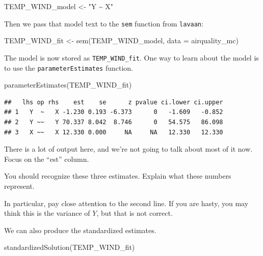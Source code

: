 \documentclass[
]{book}
\newenvironment{Shaded}{\begin{snugshade}}{\end{snugshade}}
\newcommand{\AttributeTok}[1]{\textcolor[rgb]{0.77,0.63,0.00}{#1}}
\newcommand{\FunctionTok}[1]{\textcolor[rgb]{0.00,0.00,0.00}{#1}}
\newcommand{\NormalTok}[1]{#1}
\newcommand{\OtherTok}[1]{\textcolor[rgb]{0.56,0.35,0.01}{#1}}
\newcommand{\StringTok}[1]{\textcolor[rgb]{0.31,0.60,0.02}{#1}}
\begin{document}
\begin{Shaded}
\begin{Highlighting}[]
\NormalTok{TEMP\_WIND\_model }\OtherTok{\textless{}{-}} \StringTok{"Y \textasciitilde{} X"}
\end{Highlighting}
\end{Shaded}

Then we pass that model text to the \texttt{sem} function from \texttt{lavaan}:

\begin{Shaded}
\begin{Highlighting}[]
\NormalTok{TEMP\_WIND\_fit }\OtherTok{\textless{}{-}} \FunctionTok{sem}\NormalTok{(TEMP\_WIND\_model, }\AttributeTok{data =}\NormalTok{ airquality\_mc)}
\end{Highlighting}
\end{Shaded}

The model is now stored as \texttt{TEMP\_WIND\_fit}. One way to learn about the model is to use the \texttt{parameterEstimates} function.

\begin{Shaded}
\begin{Highlighting}[]
\FunctionTok{parameterEstimates}\NormalTok{(TEMP\_WIND\_fit)}
\end{Highlighting}
\end{Shaded}

\begin{verbatim}
##   lhs op rhs    est    se      z pvalue ci.lower ci.upper
## 1   Y  ~   X -1.230 0.193 -6.373      0   -1.609   -0.852
## 2   Y ~~   Y 70.337 8.042  8.746      0   54.575   86.098
## 3   X ~~   X 12.330 0.000     NA     NA   12.330   12.330
\end{verbatim}

There is a lot of output here, and we're not going to talk about most of it now. Focus on the ``est'' column.

You should recognize these three estimates. Explain what these numbers represent.

In particular, pay close attention to the second line. If you are hasty, you may think this is the variance of \(Y\), but that is not correct.

We can also produce the standardized estimates.

\begin{Shaded}
\begin{Highlighting}[]
\FunctionTok{standardizedSolution}\NormalTok{(TEMP\_WIND\_fit)}
\end{Highlighting}
\end{Shaded}
\end{document}
